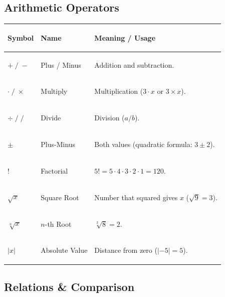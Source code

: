 \documentclass[11pt, letterpaper]{article}
\begin{document}
\subsection*{Arithmetic Operators}

\noindent
{\renewcommand{\arraystretch}{1.5}
\begin{tabularx}{\textwidth}{>{\centering\arraybackslash}p{1.5cm}
                              >{\bfseries\raggedright\arraybackslash}p{3cm}
                              >{\raggedright\arraybackslash}X}
\toprule
\rowcolor{tableheaderpurple}
\textbf{Symbol} & \textbf{Name} & \textbf{Meaning / Usage} \\
\midrule
\rowcolor{rowPu} $+ \; / \; -$ & Plus / Minus & Addition and subtraction. \\
\rowcolor{rowA}  $\cdot \; / \; \times$ & Multiply & Multiplication ($3 \cdot x$ or $3 \times x$). \\
\rowcolor{rowPu} $\div \; / \; /$ & Divide & Division ($a / b$). \\
\rowcolor{rowA}  $\pm$ & Plus-Minus & Both values (quadratic formula: $3 \pm 2$). \\
\rowcolor{rowPu} $!$ & Factorial & $5! = 5 \cdot 4 \cdot 3 \cdot 2 \cdot 1 = 120$. \\
\rowcolor{rowA}  $\sqrt{x}$ & Square Root & Number that squared gives $x$ ($\sqrt{9} = 3$). \\
\rowcolor{rowPu} $\sqrt[n]{x}$ & $n$-th Root & $\sqrt[3]{8} = 2$. \\
\rowcolor{rowA}  $|x|$ & Absolute Value & Distance from zero ($|{-5}| = 5$). \\
\bottomrule
\end{tabularx}}

\subsection*{Relations \& Comparison}
\end{document}
